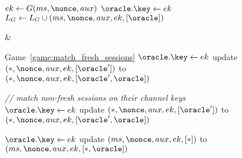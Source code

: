\begin{figure}
\begin{leftfullpage}
\begin{adjustbox}{tabular={cc},Trim=0.9ex 0 0 0, width=\textwidth}
\begin{adjustbox}{minipage=[t]{\codewidth},fbox}
\begin{algorithmic}[1]
			\color{black}
			
			\Else  
				\State {}
				\State $ek \gets G(ms, \nonce, aux)$\label{alg:line:send_game_hops_RO_call}
				\State $\oracle.\key \gets ek$
				\State $L_G \gets L_G \cup (ms, \nonce, aux, ek, [\oracle]) $
			\EndIf
			
		\end{algorithmic}
	\end{adjustbox}	
	
	&	
	
	\begin{adjustbox}{minipage=[t][]{\codewidth},fbox}
	
		\begin{algorithmic}[1]
			
			
			\color{black}
			\State {}
			\Comment Game~\ref{game:match_fresh_sessions}
				\State $\oracle.\key \gets ek$
				\State update $(*, \nonce, aux, ek, [\oracle'])$ to $(*, \nonce, aux, ek, [\oracle', \oracle])$
		
			\color{hidecode}
		
			\State \hspace*{-\algorithmicindent} \textcolor{hidecode}{\emph{// match non-fresh sessions on their channel keys}}		
				\State $\oracle.\key \gets ek$
				\State update $(*, \nonce, aux, ek, [\oracle'])$ to $(*, \nonce, aux, ek, [\oracle', \oracle])$
			
			\color{black}
			\vspace{2.26pt}
		
			\State \hspace*{-\algorithmicindent} 
				\State $\oracle.\key \gets ek$
				\State update $(ms, \nonce, aux, ek, [*])$ to $(ms, \nonce, aux, ek, [*,\oracle])$
			

\end{algorithmic}
\end{adjustbox}
\end{adjustbox}
\end{leftfullpage}
\end{figure}
